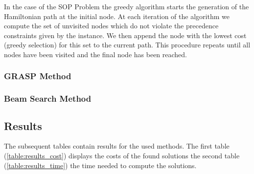 \documentclass[]{article}
\begin{document}
   	In the case of the SOP Problem the greedy algorithm starts the generation of the Hamiltonian path at the initial node. At each iteration of the algorithm we compute the set of unvisited nodes which do not violate the precedence constraints given by the instance. We then append the node with the lowest cost (greedy selection) for this set to the current path. This procedure repeats until all nodes have been visited and the final node has been reached.

    \subsubsection{GRASP Method}


    \subsubsection{Beam Search Method}


    \subsection{Results}
    \label{results}

    The subsequent tables contain results for the used methods. The first table (\ref{table:results_cost}) displays the costs of the found solutions the second table (\ref{table:results_time}) the time needed to compute the solutions. 
\end{document}
